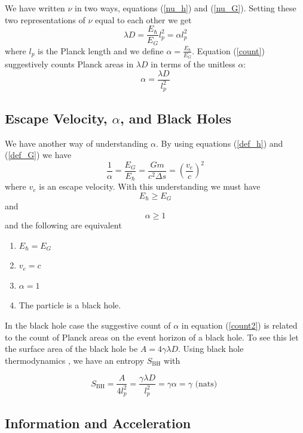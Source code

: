 \documentclass[12pt,a4paper]{article}
\begin{document}
We have written $\nu$ in two ways, equations (\ref{nu_h}) and (\ref{nu_G}). Setting these two representations of $\nu$ equal to each other we get
\begin{equation}
\label{count}
\lambda D = \frac{E_\hslash}{E_G} l_p^2 = \alpha l_p^2
\end{equation}
where $l_p$ is the Planck length and we define $\alpha = \frac{E_\hslash}{E_G}$. Equation (\ref{count}) suggestively counts Planck areas in $\lambda D$ in terms of the unitless $\alpha$:
\begin{equation}
\label{count2}
   \alpha = \frac{\lambda D}{l_p^2}
\end{equation}


\subsection{Escape Velocity, $\alpha$, and Black Holes}
We have another way of understanding $\alpha$.  By using equations (\ref{def_h}) and (\ref{def_G}) we have
\begin{equation}
\label{escape}
  \frac{1}{\alpha} = \frac{E_G}{E_\hslash} = \frac{Gm}{c^2\Delta s} = \left(\frac{v_e}{c}\right)^2
\end{equation}
where $v_e$ is an escape velocity.  With this understanding we must have
\begin{equation}
\label{ine}
   E_\hslash \ge E_G
\end{equation}
and
\begin{equation}
\label{alphaone}
  \alpha \ge 1 
\end{equation}
and the following are equivalent
\begin{enumerate}
\item $E_\hslash = E_G$
\item $v_e = c$
\item $\alpha = 1$
\item The particle is a black hole.
\end{enumerate}
In the black hole case the suggestive count of $\alpha$ in equation (\ref{count2}) is related to the count of Planck areas on the event horizon of a black hole.  To see this let the surface area of the black hole be $A = 4 \gamma \lambda D$.  Using black hole thermodynamics \cite{bekenstein}, we have an entropy $S_\text{BH}$ with

\[
  S_\text{BH} = \frac{A}{4 l_p^2} = \frac{\gamma \lambda D}{l_p^2} = \gamma \alpha = \gamma \text{ (nats) }
\]

\subsection{Information and Acceleration}
\end{document}

